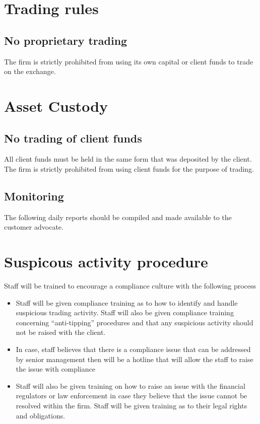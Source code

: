 \section{Trading rules}

\subsection{No proprietary trading}
The firm is strictly prohibited from using its own capital or client
funds to trade on the exchange.

\section{Asset Custody}
\subsection{No trading of client funds}
All client funds must be held in the same form that was deposited by
the client.  The firm is strictly prohibited from using client funds
for the purpose of trading.

\subsection{Monitoring}

The following daily reports should be compiled and made available to
the customer advocate.


\section{Suspicous activity procedure}
Staff will be trained to encourage a compliance culture with the
following process
\begin{itemize}
  \item Staff will be given compliance training as to how to identify
    and handle suspicious trading activity.  Staff will also be given
    compliance training concerning ``anti-tipping'' procedures and
    that any suspicious activity should not be raised with the client.
  \item In case, staff believes that there is a compliance issue that
    can be addressed by senior management then will be a hotline that
    will allow the staff to raise the issue with compliance
  \item Staff will also be given training on how to raise an issue
    with the financial regulators or law enforcement in case they
    believe that the issue cannot be resolved within the firm.  Staff
    will be given training as to their legal rights and obligations.
\end{itemize}

